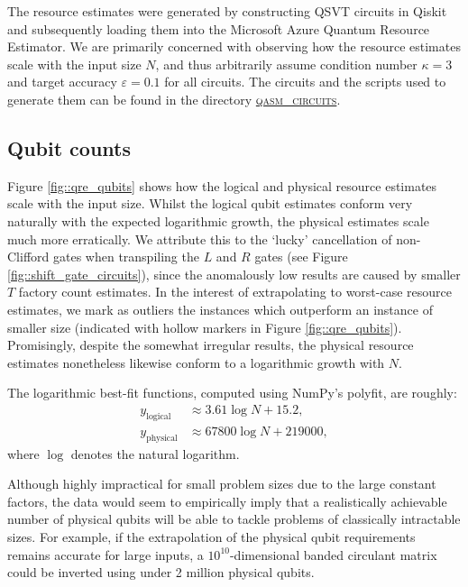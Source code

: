 \documentclass[10pt, twocolumn]{article}
\begin{document}
The resource estimates were generated by constructing QSVT circuits in Qiskit and subsequently loading them into the Microsoft Azure Quantum Resource Estimator. We are primarily concerned with observing how the resource estimates scale with the input size $N$, and thus arbitrarily assume condition number $\kappa=3$ and target accuracy $\varepsilon=0.1$ for all circuits. The circuits and the scripts used to generate them can be found in the directory \href{https://github.com/Walden-Killick/QCE24-QRE-Challenge/tree/main/qasm_circuits}{\textsc{qasm\_circuits}}.

\subsection{Qubit counts}

Figure \ref{fig::qre_qubits} shows how the logical and physical resource estimates scale with the input size. Whilst the logical qubit estimates conform very naturally with the expected logarithmic growth, the physical estimates scale much more erratically. We attribute this to the `lucky' cancellation of non-Clifford gates when transpiling the $L$ and $R$ gates (see Figure \ref{fig::shift_gate_circuits}), since the anomalously low results are caused by smaller $T$ factory count estimates. In the interest of extrapolating to worst-case resource estimates, we mark as outliers the instances which outperform an instance of smaller size (indicated with hollow markers in Figure \ref{fig::qre_qubits}). Promisingly, despite the somewhat irregular results, the physical resource estimates nonetheless likewise conform to a logarithmic growth with $N$.

The logarithmic best-fit functions, computed using NumPy's polyfit, are roughly:
\begin{align*}
	y_\text{logical} &\approx 3.61 \log{N} + 15.2, \\
	y_\text{physical} &\approx 67800 \log{N} + 219000,
\end{align*}
where $\log$ denotes the natural logarithm.

Although highly impractical for small problem sizes due to the large constant factors, the data would seem to empirically imply that a realistically achievable number of physical qubits will be able to tackle problems of classically intractable sizes. For example, if the extrapolation of the physical qubit requirements remains accurate for large inputs, a $10^{10}$-dimensional banded circulant matrix could be inverted using under 2 million physical qubits.
\end{document}
